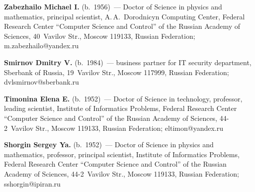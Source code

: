 \vspace*{3pt}

\noindent
\textbf{Zabezhailo Michael I.} (b.\ 1956)~--- Doctor of Science in physics and mathematics, principal 
scientist, A.\,A.~Dorodnicyn Computing Center, Federal Research Center ``Computer Science and 
Control'' of the Russian Academy of Sciences, 40~Vavilov Str., Moscow 119133, Russian 
Federation; \mbox{m.zabezhailo@yandex.ru}

\vspace*{3pt}



\noindent
\textbf{Smirnov Dmitry V.} (b.\ 1984)~--- business partner for IT security department, Sberbank of 
Russia, 19~Vavilov Str., Moscow 117999, Russian Federation; \mbox{dvlsmirnov@sberbank.ru}

\vspace*{3pt}

\noindent
\textbf{Timonina Elena E.} (b.\ 1952)~--- Doctor of Science in technology, professor, leading scientist, 
Institute of Informatics Problems, Federal Research Center ``Computer Science and Control'' of the 
Russian Academy of Sciences, 44-2~Vavilov Str., Moscow 119133, Russian Federation; 
\mbox{eltimon@yandex.ru}

\vspace*{3pt}

\noindent
\textbf{Shorgin Sergey Ya.} (b.\ 1952)~--- Doctor of Science in physics and mathematics, professor, 
principal scientist, Institute of Informatics Problems, Federal Research Center ``Computer Science and 
Control'' of the Russian Academy of Sciences, 44-2~Vavilov Str., Moscow 119133, Russian 
Federation; \mbox{sshorgin@ipiran.ru}

\label{end\stat}

\renewcommand{\bibname}{\protect\rm Литература}